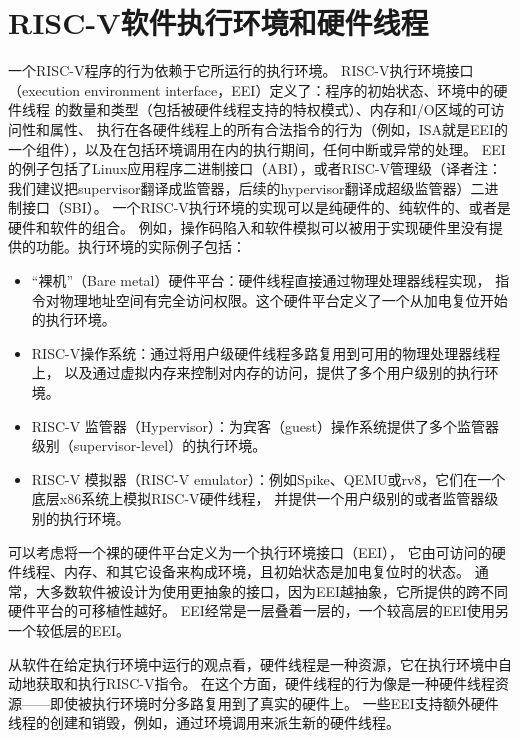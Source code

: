 \section{RISC-V软件执行环境和硬件线程}

一个RISC-V程序的行为依赖于它所运行的执行环境。
RISC-V执行环境接口（execution environment interface，EEI）定义了：程序的初始状态、环境中的硬件线程
的数量和类型（包括被硬件线程支持的特权模式）、内存和I/O区域的可访问性和属性、
执行在各硬件线程上的所有合法指令的行为（例如，ISA就是EEI的一个组件），以及在包括环境调用在内的执行期间，任何中断或异常的处理。
EEI的例子包括了Linux应用程序二进制接口（ABI），或者RISC-V管理级（译者注：我们建议把supervisor翻译成监管器，后续的hypervisor翻译成超级监管器）二进制接口（SBI）。
一个RISC-V执行环境的实现可以是纯硬件的、纯软件的、或者是硬件和软件的组合。
例如，操作码陷入和软件模拟可以被用于实现硬件里没有提供的功能。执行环境的实际例子包括：


\begin{itemize}
  \item “裸机”（Bare metal）硬件平台：硬件线程直接通过物理处理器线程实现，
  指令对物理地址空间有完全访问权限。这个硬件平台定义了一个从加电复位开始的执行环境。

  \item RISC-V操作系统：通过将用户级硬件线程多路复用到可用的物理处理器线程上，
  以及通过虚拟内存来控制对内存的访问，提供了多个用户级别的执行环境。

  \item RISC-V 监管器（Hypervisor）：为宾客（guest）操作系统提供了多个监管器级别（supervisor-level）的执行环境。 

  \item RISC-V 模拟器（RISC-V emulator）：例如Spike、QEMU或rv8，它们在一个底层x86系统上模拟RISC-V硬件线程，
  并提供一个用户级别的或者监管器级别的执行环境。

\end{itemize}

\begin{commentary}
  可以考虑将一个裸的硬件平台定义为一个执行环境接口（EEI），
  它由可访问的硬件线程、内存、和其它设备来构成环境，且初始状态是加电复位时的状态。
  通常，大多数软件被设计为使用更抽象的接口，因为EEI越抽象，它所提供的跨不同硬件平台的可移植性越好。
  EEI经常是一层叠着一层的，一个较高层的EEI使用另一个较低层的EEI。
\end{commentary}

从软件在给定执行环境中运行的观点看，硬件线程是一种资源，它在执行环境中自动地获取和执行RISC-V指令。
在这个方面，硬件线程的行为像是一种硬件线程资源——即使被执行环境时分多路复用到了真实的硬件上。
一些EEI支持额外硬件线程的创建和销毁，例如，通过环境调用来派生新的硬件线程。


